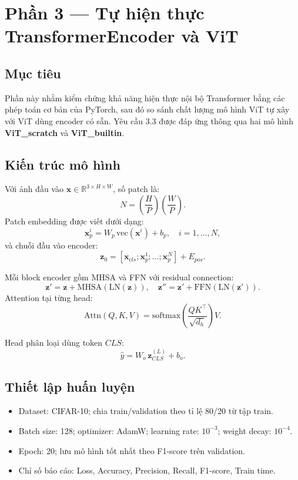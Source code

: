 \section{Phần 3 --- Tự hiện thực TransformerEncoder và ViT}

\subsection{Mục tiêu}
Phần này nhằm kiểm chứng khả năng hiện thực nội bộ Transformer bằng các phép toán cơ bản của PyTorch, sau đó so sánh chất lượng mô hình ViT tự xây với ViT dùng encoder có sẵn. Yêu cầu 3.3 được đáp ứng thông qua hai mô hình \textbf{ViT\_scratch} và \textbf{ViT\_builtin}.

\subsection{Kiến trúc mô hình}
Với ảnh đầu vào \(\mathbf{x}\in\mathbb{R}^{3\times H\times W}\), số patch là:
\[
N = \left(\frac{H}{P}\right)\left(\frac{W}{P}\right).
\]
Patch embedding được viết dưới dạng:
\[
\mathbf{x}_p^i = W_p\,\mathrm{vec}(\mathbf{x}^i)+b_p,\quad i=1,\dots,N,
\]
và chuỗi đầu vào encoder:
\[
\mathbf{z}_0 = [\mathbf{x}_{cls};\mathbf{x}_p^1;\dots;\mathbf{x}_p^N] + E_{pos}.
\]

Mỗi block encoder gồm MHSA và FFN với residual connection:
\[
\mathbf{z}' = \mathbf{z} + \mathrm{MHSA}(\mathrm{LN}(\mathbf{z})),
\quad
\mathbf{z}'' = \mathbf{z}' + \mathrm{FFN}(\mathrm{LN}(\mathbf{z}')).
\]
Attention tại từng head:
\[
\mathrm{Attn}(Q,K,V)=\mathrm{softmax}\left(\frac{QK^\top}{\sqrt{d_h}}\right)V.
\]

Head phân loại dùng token \(CLS\):
\[
\hat{y}=W_o\,\mathbf{z}_{CLS}^{(L)}+b_o.
\]

\subsection{Thiết lập huấn luyện}
\begin{itemize}
    \item Dataset: CIFAR-10; chia train/validation theo tỉ lệ 80/20 từ tập train.
    \item Batch size: 128; optimizer: AdamW; learning rate: \(10^{-3}\); weight decay: \(10^{-4}\).
    \item Epoch: 20; lưu mô hình tốt nhất theo F1-score trên validation.
    \item Chỉ số báo cáo: Loss, Accuracy, Precision, Recall, F1-score, Train time.
\end{itemize}

